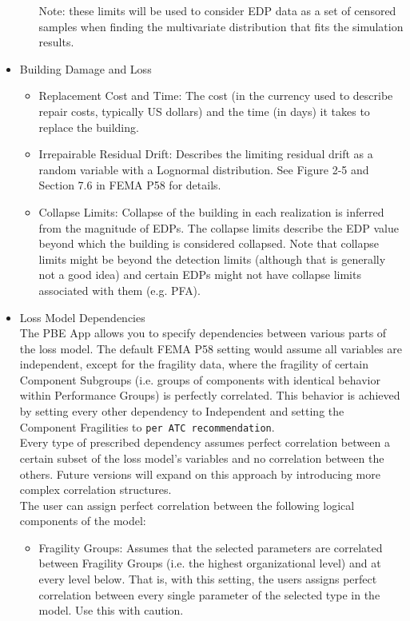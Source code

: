 \begin{itemize}
\begin{itemize}
        Note: these limits will be used to consider EDP data as a set of censored samples when finding the multivariate distribution that fits the simulation results.
    \end{itemize}
    \item Building Damage and Loss
    \begin{itemize}
        \item Replacement Cost and Time: The cost (in the currency used to describe repair costs, typically US dollars) and the time (in days) it takes to replace the building.
        \item Irrepairable Residual Drift: Describes the limiting residual drift as a random variable with a Lognormal distribution. See Figure 2-5 and Section 7.6 in FEMA P58 for details.
        \item Collapse Limits: Collapse of the building in each realization is inferred from the magnitude of EDPs. The collapse limits describe the EDP value beyond which the building is considered collapsed. Note that collapse limits might be beyond the detection limits (although that is generally not a good idea) and certain EDPs might not have collapse limits associated with them (e.g. PFA).
    \end{itemize}
    \item Loss Model Dependencies\\
    The PBE App allows you to specify dependencies between various parts of the loss model. The default FEMA P58 setting would assume all variables are independent, except for the fragility data, where the fragility of certain Component Subgroups (i.e. groups of components with identical behavior within Performance Groups) is perfectly correlated. This behavior is achieved by setting every other dependency to Independent and setting the Component Fragilities to \texttt{per ATC recommendation}.\\
    Every type of prescribed dependency assumes perfect correlation between a certain subset of the loss model’s variables and no correlation between the others. Future versions will expand on this approach by introducing more complex correlation structures.\\
    The user can assign perfect correlation between the following logical components of the model:
    \begin{itemize}
        \item Fragility Groups: Assumes that the selected parameters are correlated between Fragility Groups (i.e. the highest organizational level) and at every level below. That is, with this setting, the users assigns perfect correlation between every single parameter of the selected type in the model. Use this with caution.

\end{itemize}
\end{itemize}
